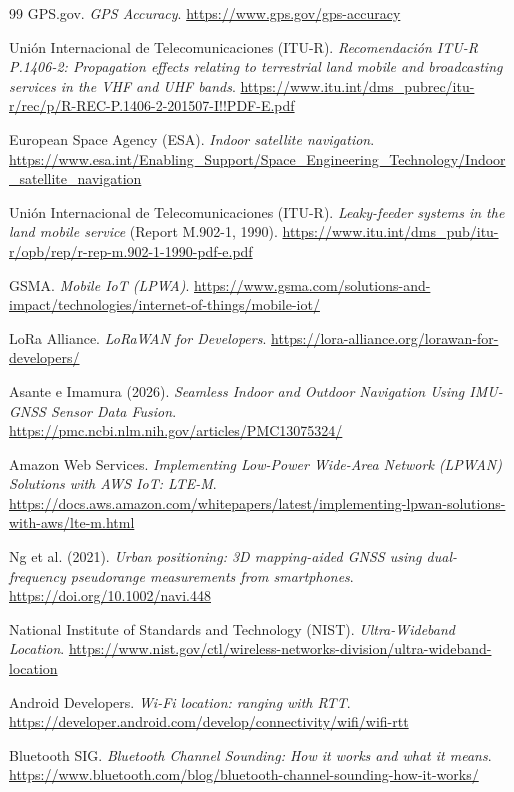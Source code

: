 \documentclass[11pt,a4paper]{article}
\begin{document}
\begin{thebibliography}{99}
     GPS.gov. \emph{GPS Accuracy}. \url{https://www.gps.gov/gps-accuracy}

     Unión Internacional de Telecomunicaciones (ITU-R). \emph{Recomendación ITU-R P.1406-2: Propagation effects relating to terrestrial land mobile and broadcasting services in the VHF and UHF bands}. \url{https://www.itu.int/dms_pubrec/itu-r/rec/p/R-REC-P.1406-2-201507-I!!PDF-E.pdf}

     European Space Agency (ESA). \emph{Indoor satellite navigation}. \url{https://www.esa.int/Enabling_Support/Space_Engineering_Technology/Indoor_satellite_navigation}

     Unión Internacional de Telecomunicaciones (ITU-R). \emph{Leaky-feeder systems in the land mobile service} (Report M.902-1, 1990). \url{https://www.itu.int/dms_pub/itu-r/opb/rep/r-rep-m.902-1-1990-pdf-e.pdf}

     GSMA. \emph{Mobile IoT (LPWA)}. \url{https://www.gsma.com/solutions-and-impact/technologies/internet-of-things/mobile-iot/}

     LoRa Alliance. \emph{LoRaWAN for Developers}. \url{https://lora-alliance.org/lorawan-for-developers/}

     Asante e Imamura (2026). \emph{Seamless Indoor and Outdoor Navigation Using IMU-GNSS Sensor Data Fusion}. \url{https://pmc.ncbi.nlm.nih.gov/articles/PMC13075324/}

     Amazon Web Services. \emph{Implementing Low-Power Wide-Area Network (LPWAN) Solutions with AWS IoT: LTE-M}. \url{https://docs.aws.amazon.com/whitepapers/latest/implementing-lpwan-solutions-with-aws/lte-m.html}

     Ng et al. (2021). \emph{Urban positioning: 3D mapping-aided GNSS using dual-frequency pseudorange measurements from smartphones}. \url{https://doi.org/10.1002/navi.448}

     National Institute of Standards and Technology (NIST). \emph{Ultra-Wideband Location}. \url{https://www.nist.gov/ctl/wireless-networks-division/ultra-wideband-location}

     Android Developers. \emph{Wi-Fi location: ranging with RTT}. \url{https://developer.android.com/develop/connectivity/wifi/wifi-rtt}

     Bluetooth SIG. \emph{Bluetooth Channel Sounding: How it works and what it means}. \url{https://www.bluetooth.com/blog/bluetooth-channel-sounding-how-it-works/}


\end{thebibliography}
\end{document}
